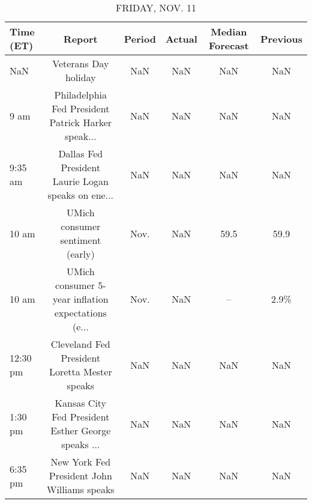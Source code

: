 \documentclass{article}%
\begin{document}
\begin{table}[htbp]%
\caption{FRIDAY, NOV. 11}%
\centering%
\begin{adjustbox}{width=1\textwidth}%
\begin{tabular}{lccccc}
\toprule
Time (ET) &                                             Report & Period & Actual & Median Forecast & Previous \\
\midrule
      NaN &                               Veterans Day holiday &    NaN &    NaN &             NaN &      NaN \\
     9 am & Philadelphia Fed President Patrick Harker speak... &    NaN &    NaN &             NaN &      NaN \\
  9:35 am & Dallas Fed President Laurie Logan speaks on ene... &    NaN &    NaN &             NaN &      NaN \\
    10 am &                   UMich consumer sentiment (early) &   Nov. &    NaN &            59.5 &     59.9 \\
    10 am & UMich consumer 5-year inflation expectations (e... &   Nov. &    NaN &              -- &     2.9\% \\
 12:30 pm &      Cleveland Fed President Loretta Mester speaks &    NaN &    NaN &             NaN &      NaN \\
  1:30 pm & Kansas City Fed President Esther George speaks ... &    NaN &    NaN &             NaN &      NaN \\
  6:35 pm &        New York Fed President John Williams speaks &    NaN &    NaN &             NaN &      NaN \\
\bottomrule
\end{tabular}
%
\end{adjustbox}%
\end{table}
\end{document}
